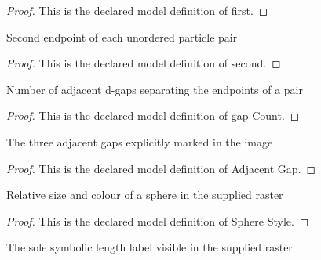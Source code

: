 \begin{proof}
  This is the declared model definition of first.
\end{proof}
\begin{definition}[second]
  \label{def:physics:phyx-mini-0535:phyxminiproblems-problemphyxmini0535-particlepair-second}
  Second endpoint of each unordered particle pair
\end{definition}
\begin{proof}
  This is the declared model definition of second.
\end{proof}
\begin{definition}
  \label{def:physics:phyx-mini-0535:phyxminiproblems-problemphyxmini0535-particlepair-gapcount}
  Number of adjacent d-gaps separating the endpoints of a pair
\end{definition}
\begin{proof}
  This is the declared model definition of gap Count.
\end{proof}
\begin{definition}
  \label{def:physics:phyx-mini-0535:phyxminiproblems-problemphyxmini0535-adjacentgap}
  The three adjacent gaps explicitly marked in the image
\end{definition}
\begin{proof}
  This is the declared model definition of Adjacent Gap.
\end{proof}
\begin{definition}
  \label{def:physics:phyx-mini-0535:phyxminiproblems-problemphyxmini0535-spherestyle}
  Relative size and colour of a sphere in the supplied raster
\end{definition}
\begin{proof}
  This is the declared model definition of Sphere Style.
\end{proof}
\begin{definition}
  \label{def:physics:phyx-mini-0535:phyxminiproblems-problemphyxmini0535-figurelabel}
  The sole symbolic length label visible in the supplied raster
\end{definition}
